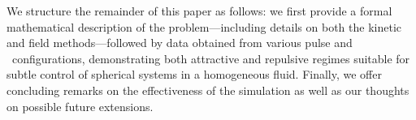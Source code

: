 We structure the remainder of this paper as follows: we first provide a formal mathematical description of the problem---including details on both the kinetic and field methods---followed by data obtained from various pulse and \bubble\ configurations, demonstrating both attractive and repulsive regimes suitable for subtle control of spherical systems in a homogeneous fluid.
Finally, we offer concluding remarks on the effectiveness of the simulation as well as our thoughts on possible future extensions.
